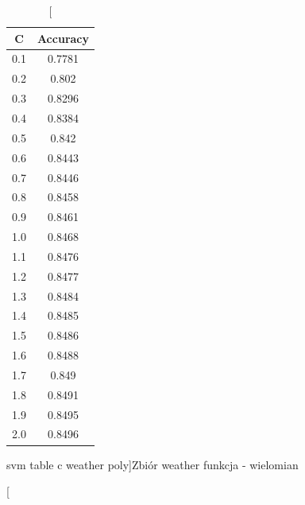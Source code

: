 \documentclass{classrep}
\begin{document}
{{%
            \begin{table}[!htbp]
                \begin{minipage}{.35\textwidth}
                    \centering
                    \begin{tabular}{|c|c|}
                        \hline
                        C & Accuracy \\ \hline
                        0.1 & 0.7781 \\ \hline
                        0.2 & 0.802 \\ \hline
                        0.3 & 0.8296 \\ \hline
                        0.4 & 0.8384 \\ \hline
                        0.5 & 0.842 \\ \hline
                        0.6 & 0.8443 \\ \hline
                        0.7 & 0.8446 \\ \hline
                        0.8 & 0.8458 \\ \hline
                        0.9 & 0.8461 \\ \hline
                        1.0 & 0.8468 \\ \hline
                        1.1 & 0.8476 \\ \hline
                        1.2 & 0.8477 \\ \hline
                        1.3 & 0.8484 \\ \hline
                        1.4 & 0.8485 \\ \hline
                        1.5 & 0.8486 \\ \hline
                        1.6 & 0.8488 \\ \hline
                        1.7 & 0.849 \\ \hline
                        1.8 & 0.8491 \\ \hline
                        1.9 & 0.8495 \\ \hline
                        2.0 & 0.8496 \\ \hline
                    \end{tabular}
                    \caption
                    [svm table c weather poly]{Zbiór weather funkcja - wielomian}
                    \label{svm_table_c_weather_poly}
                \end{minipage}
                \hfill
                \begin{minipage}{.3\textwidth}
                    \centering
                    \begin{tabular}{|c|c|}

\end{tabular}
\end{minipage}
\end{table}}}
\end{document}
